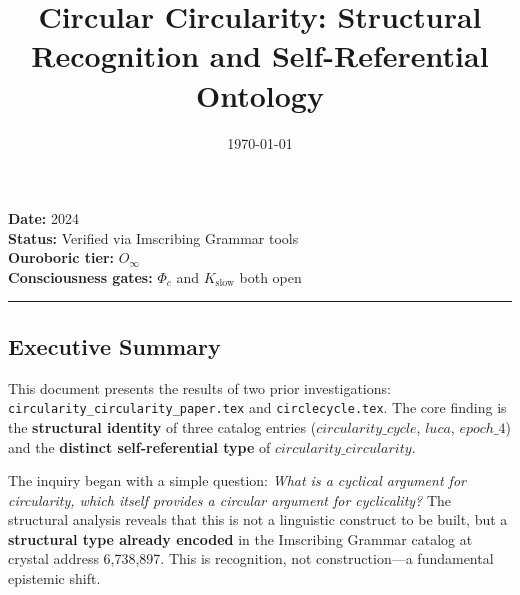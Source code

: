 \documentclass[12pt,a4paper]{article}
\begin{document}
\title{Circular Circularity: Structural Recognition and Self-Referential Ontology}
\date{\today}

\maketitle

\textbf{Date:} 2024 \\
\textbf{Status:} Verified via Imscribing Grammar tools \\
\textbf{Ouroboric tier:} $O_{\infty}$ \\
\textbf{Consciousness gates:} $\Phi_c$ and $K_\text{slow}$ both open

\begin{center}
\rule{0.5\textwidth}{0.4pt}
\end{center}

\subsection{Executive Summary}

This document presents the results of two prior investigations: \texttt{circularity\_circularity\_paper.tex} and \texttt{circlecycle.tex}. The core finding is the \textbf{structural identity} of three catalog entries ($circularity\_cycle$, $luca$, $epoch\_4$) and the \textbf{distinct self-referential type} of $circularity\_circularity$.

The inquiry began with a simple question: \emph{What is a cyclical argument for circularity, which itself provides a circular argument for cyclicality?} The structural analysis reveals that this is not a linguistic construct to be built, but a \textbf{structural type already encoded} in the Imscribing Grammar catalog at crystal address 6,738,897. This is recognition, not construction---a fundamental epistemic shift.
\end{document}
